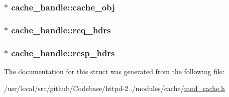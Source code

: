\subsubsection[{\texorpdfstring{cache\+\_\+obj}{cache_obj}}]{$\ast$ cache\+\_\+handle\+::cache\+\_\+obj}\hypertarget{structcache__handle_aea71e9fd166a32e0fe46a12668a1f3bd}{}\label{structcache__handle_aea71e9fd166a32e0fe46a12668a1f3bd}
\subsubsection[{\texorpdfstring{req\+\_\+hdrs}{req_hdrs}}]{$\ast$ cache\+\_\+handle\+::req\+\_\+hdrs}\hypertarget{structcache__handle_a3d302af4d74f9067d16e6398f0b709ae}{}\label{structcache__handle_a3d302af4d74f9067d16e6398f0b709ae}
\subsubsection[{\texorpdfstring{resp\+\_\+hdrs}{resp_hdrs}}]{$\ast$ cache\+\_\+handle\+::resp\+\_\+hdrs}\hypertarget{structcache__handle_a66c4c1875bb9740d34ddda4d3e71065e}{}\label{structcache__handle_a66c4c1875bb9740d34ddda4d3e71065e}


The documentation for this struct was generated from the following file\+:\begin{DoxyCompactItemize}
\item 
/usr/local/src/github/\+Codebase/httpd-\/2../modules/cache/\hyperlink{mod__cache_8h}{mod\+\_\+cache.\+h}\end{DoxyCompactItemize}
